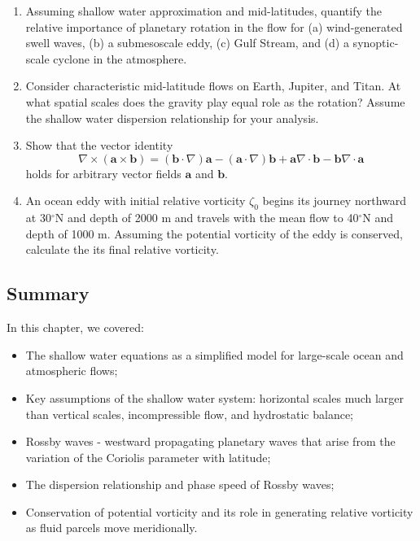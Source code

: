 \documentclass[12pt]{article}
\numberwithin{equation}{section}
\numberwithin{figure}{section}
\numberwithin{table}{section}
\begin{document}
\begin{enumerate}
  \item Assuming shallow water approximation and mid-latitudes, quantify the
  relative importance of planetary rotation in the flow for (a) wind-generated
  swell waves, (b) a submesoscale eddy, (c) Gulf Stream, and (d) a synoptic-scale
  cyclone in the atmosphere.
  \item Consider characteristic mid-latitude flows on Earth, Jupiter, and Titan.
  At what spatial scales does the gravity play equal role as the rotation?
  Assume the shallow water dispersion relationship for your analysis.
  \item Show that the vector identity
  \begin{equation}
    \nabla \times (\mathbf{a} \times \mathbf{b}) =
    (\mathbf{b} \cdot \nabla) \mathbf{a} - (\mathbf{a} \cdot \nabla) \mathbf{b} +
    \mathbf{a} \nabla \cdot \mathbf{b} - \mathbf{b} \nabla \cdot \mathbf{a}
  \end{equation}
  holds for arbitrary vector fields $\mathbf{a}$ and $\mathbf{b}$.
  \item An ocean eddy with initial relative vorticity $\zeta_0$ begins its
  journey northward at 30$^\circ$N and depth of 2000 m and travels with the
  mean flow to 40$^\circ$N and depth of 1000 m.
  Assuming the potential vorticity of the eddy is conserved, calculate the its
  final relative vorticity.
\end{enumerate}

\subsection*{Summary}

In this chapter, we covered:

\begin{itemize}
  \item The shallow water equations as a simplified model for large-scale ocean and atmospheric flows;
  \item Key assumptions of the shallow water system: horizontal scales much larger than vertical scales, incompressible flow, and hydrostatic balance;
  \item Rossby waves - westward propagating planetary waves that arise from the variation of the Coriolis parameter with latitude;
  \item The dispersion relationship and phase speed of Rossby waves;
  \item Conservation of potential vorticity and its role in generating relative vorticity as fluid parcels move meridionally.
\end{itemize}
\end{document}
